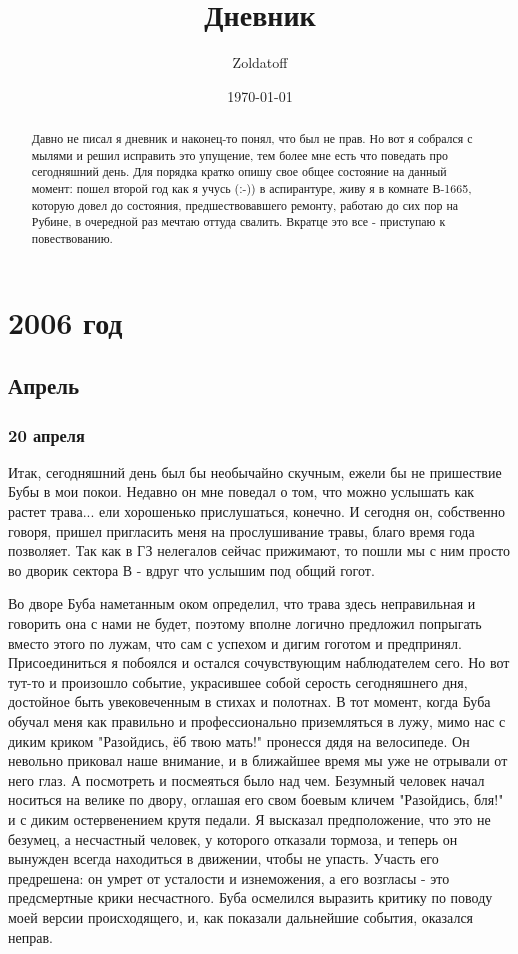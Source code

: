 \documentclass[12pt,a4paper]{article}
\newcommand{\ssubsection}[1]{
	\subsubsection*{#1}
	\addcontentsline{toc}{subsubsection}{#1}
}
\begin{document}
\author{Zoldatoff}
\title{Дневник}
\date{\today}
\maketitle
\tableofcontents
\begin{abstract}
Давно не писал я дневник и наконец-то понял, что был не прав. Но вот я собрался с мылями и решил исправить это упущение, тем более мне есть что поведать про сегодняшний день. Для порядка кратко опишу свое общее состояние на данный момент: пошел второй год как я учусь (:-)) в аспирантуре, живу я в комнате В-1665, которую довел до состояния, предшествовавшего ремонту, работаю до сих пор на Рубине, в очередной раз мечтаю оттуда свалить. Вкратце это все - приступаю к повествованию.
\end{abstract}

\section*{2006 год}

\subsection*{Апрель}

\ssubsection{20 апреля}
Итак, сегодняшний день был бы необычайно скучным, ежели бы не пришествие Бубы в мои покои. Недавно он мне поведал о том, что можно услышать как растет трава... ели хорошенько прислушаться, конечно. И сегодня он, собственно говоря, пришел пригласить меня на прослушивание травы, благо время года позволяет. Так как в ГЗ нелегалов сейчас прижимают, то пошли мы с ним просто во дворик сектора В - вдруг что услышим под общий гогот.

Во дворе Буба наметанным оком определил, что трава здесь неправильная и говорить она с нами не будет, поэтому вполне логично предложил попрыгать вместо этого по лужам, что сам с успехом и дигим гоготом и предпринял. Присоединиться я побоялся и остался сочувствующим наблюдателем сего. Но вот тут-то и произошло событие, украсившее собой серость сегодняшнего дня, достойное быть увековеченным в стихах и полотнах. В тот момент, когда Буба обучал меня как правильно и профессионально приземляться в лужу, мимо нас с диким криком "Разойдись, ёб твою мать!" пронесся дядя на велосипеде. Он невольно приковал наше внимание, и в ближайшее время мы уже не отрывали от него глаз. А посмотреть и посмеяться было над чем. Безумный человек начал носиться на велике по двору, оглашая его свом боевым кличем "Разойдись, бля!" и с диким остервенением крутя педали. Я высказал предположение, что это не безумец, а несчастный человек, у которого отказали тормоза, и теперь он вынужден всегда находиться в движении, чтобы не упасть. Участь его предрешена: он умрет от усталости и изнеможения, а его возгласы - это предсмертные крики несчастного. Буба осмелился выразить критику по поводу моей версии происходящего, и, как показали дальнейшие события, оказался неправ.
\end{document}
